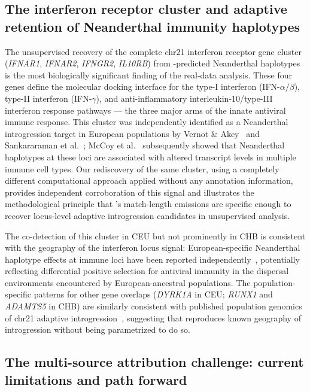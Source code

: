 \subsection*{The interferon receptor cluster and adaptive retention of Neanderthal immunity haplotypes}

The unsupervised recovery of the complete chr21 interferon receptor gene cluster
(\textit{IFNAR1}, \textit{IFNAR2}, \textit{IFNGR2}, \textit{IL10RB}) from
\AP{}-predicted Neanderthal haplotypes is the most biologically significant
finding of the real-data analysis.
These four genes define the molecular docking interface for the type-I interferon
(IFN-$\alpha/\beta$), type-II interferon (IFN-$\gamma$), and anti-inflammatory
interleukin-10/type-III interferon response pathways --- the three major arms of
the innate antiviral immune response.
This cluster was independently identified as a Neanderthal introgression target in
European populations by Vernot \& Akey~\citeyear{vernot2014resurrecting}
and Sankararaman et al.~\citeyear{sankararaman2014genomic};
McCoy et al.~\citeyear{mccoy2017impacts} subsequently showed that
Neanderthal haplotypes at these loci are associated with altered
transcript levels in multiple immune cell types.
Our rediscovery of the same cluster, using a completely different computational
approach applied without any annotation information, provides independent
corroboration of this signal and illustrates the methodological principle that
\AP{}'s match-length emissions are specific enough to recover locus-level
adaptive introgression candidates in unsupervised analysis.

The co-detection of this cluster in CEU but not prominently in CHB
is consistent with the geography of the interferon locus signal:
European-specific Neanderthal haplotype effects at immune loci have been
reported independently~\citep{dannemann2017contribution},
potentially reflecting differential positive selection for antiviral immunity
in the dispersal environments encountered by European-ancestral populations.
The population-specific patterns for other gene overlaps (\textit{DYRK1A} in CEU;
\textit{RUNX1} and \textit{ADAMTS5} in CHB) are similarly consistent with published
population genomics of chr21 adaptive introgression~\citep{vernot2016excavating},
suggesting that \AP{} reproduces known geography of introgression without being
parametrized to do so.

\subsection*{The multi-source attribution challenge: current limitations and path forward}

